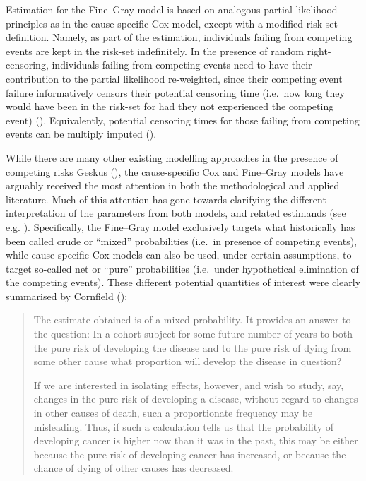 \documentclass[
  letterpaper,
  paper=240mm:170mm,
  twoside=true,
  open=right,
  fontsize=10pt,
  pagesize=false,
  BCOR=15mm,
  DIV=14,
  headinclude=true,
  footinclude=false,
  headsepline=on]{scrbook}
\begin{document}
Estimation for the Fine--Gray model is based on analogous
partial-likelihood principles as in the cause-specific Cox model, except
with a modified risk-set definition. Namely, as part of the estimation,
individuals failing from competing events are kept in the risk-set
indefinitely. In the presence of random right-censoring, individuals
failing from competing events need to have their contribution to the
partial likelihood re-weighted, since their competing event failure
informatively censors their potential censoring time (i.e.~how long they
would have been in the risk-set for had they not experienced the
competing event)
(). Equivalently, potential censoring times for those failing from
competing events can be multiply imputed
().

While there are many other existing modelling approaches in the presence
of competing risks Geskus
(), the
cause-specific Cox and Fine--Gray models have arguably received the most
attention in both the methodological and applied literature. Much of
this attention has gone towards clarifying the different interpretation
of the parameters from both models, and related estimands (see e.g.
). Specifically, the Fine--Gray model exclusively
targets what historically has been called crude or ``mixed''
probabilities (i.e.~in presence of competing events), while
cause-specific Cox models can also be used, under certain assumptions,
to target so-called net or ``pure'' probabilities (i.e.~under
hypothetical elimination of the competing events). These different
potential quantities of interest were clearly summarised by Cornfield
():

\begin{quote}
The estimate obtained is of a mixed probability. It provides an answer
to the question: In a cohort subject for some future number of years to
both the pure risk of developing the disease and to the pure risk of
dying from some other cause what proportion will develop the disease in
question?

If we are interested in isolating effects, however, and wish to study,
say, changes in the pure risk of developing a disease, without regard to
changes in other causes of death, such a proportionate frequency may be
misleading. Thus, if such a calculation tells us that the probability of
developing cancer is higher now than it was in the past, this may be
either because the pure risk of developing cancer has increased, or
because the chance of dying of other causes has decreased.
\end{quote}
\end{document}
